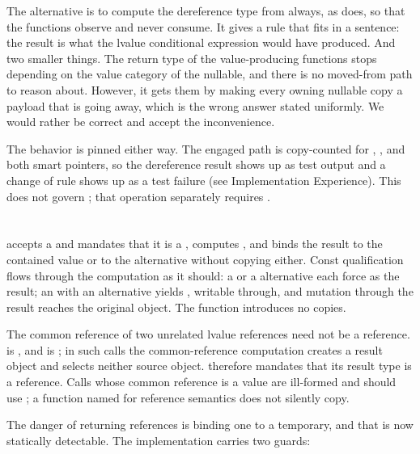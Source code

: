 \documentclass[a4paper,10pt,oneside,openany,final,article]{memoir}
\begin{document}
The alternative is to compute the dereference type from 
always, as  does, so that the functions
observe and never consume. It gives a rule that fits in a sentence: the
result is what the lvalue conditional expression would have produced. And
two smaller things. The return type of the value-producing functions stops
depending on the value category of the nullable, and there is no moved-from
path to reason about. However, it gets them by making every owning nullable
copy a payload that is going away, which is the wrong answer stated
uniformly. We would rather be correct and accept the inconvenience.

The behavior is pinned either way. The engaged path is copy-counted for
, , and both smart pointers, so the
dereference result shows up as test output and a change of rule shows up as a
test failure (see Implementation Experience). This does not govern
; that operation separately requires
.

\section{}

 accepts a  and mandates that it is a
, computes
, and binds the result to the
contained value or to the alternative without copying either. Const
qualification flows through the
computation as it should: a  or a  alternative each force  as the result; an
 with an  alternative yields ,
writable through, and mutation through the result reaches the original
object. The function introduces no copies.

The common reference of two unrelated
lvalue references need not be a reference.
 is , and
 is ;
in such calls the common-reference computation creates a result object and
selects neither source object.  therefore mandates
that its result type is a reference. Calls whose common reference is a value
are ill-formed and should use ; a function named for reference
semantics does not silently copy.

The danger of returning references is binding one to a temporary, and that
is now statically detectable. The implementation carries two guards:
\end{document}
